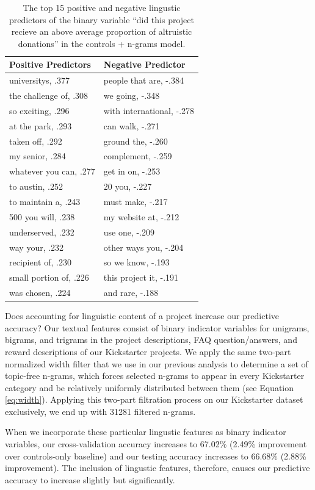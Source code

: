 \documentclass[letterpaper]{article}
\begin{document}
\begin{table}[t]
\centering
\begin{tabular}{|l|l|}
\hline
Positive Predictors & Negative Predictor \\
\hline
universitys, .377 & people that are, -.384 \\
the challenge of, .308 & we going, -.348\\
so exciting, .296 & with international, -.278\\
at the park, .293 & can walk, -.271\\
taken off, .292 & ground the, -.260\\
my senior, .284 & complement, -.259\\
whatever you can, .277 & get in on, -.253\\
to austin, .252 & 20 you, -.227\\
to maintain a, .243 & must make, -.217\\
500 you will, .238 & my website at, -.212\\
underserved, .232 & use one, -.209 \\
way your, .232 & other ways you, -.204\\
recipient of, .230 & so we know, -.193\\
small portion of, .226 & this project it, -.191\\
was chosen, .224 & and rare, -.188\\
\hline
\end{tabular}
\caption{The top 15 positive and negative lingustic predictors of the binary variable ``did this project recieve an above average proportion of altruistic donations'' in the controls + n-grams model.}
\label{tab:regression}
\end{table}

Does accounting for linguistic content of a project increase our predictive accuracy? Our textual features consist of binary indicator variables for unigrams, bigrams, and trigrams in the project descriptions, FAQ question/answers, and reward descriptions of our Kickstarter projects. We apply the same two-part normalized width filter that we use in our previous analysis to determine a set of topic-free n-grams, which forces selected n-grams to appear in every Kickstarter category and be relatively uniformly distributed between them (see Equation \ref{eq:width}). Applying this two-part filtration process on our Kickstarter dataset exclusively, we end up with 31281 filtered n-grams.

When we incorporate these particular lingustic features as binary indicator variables, our cross-validation accuracy increases to 67.02\% (2.49\% improvement over controls-only baseline) and our testing accuracy increases to 66.68\% (2.88\% improvement). The inclusion of lingustic features, therefore, causes our predictive accuracy to increase slightly but significantly.
\end{document}

